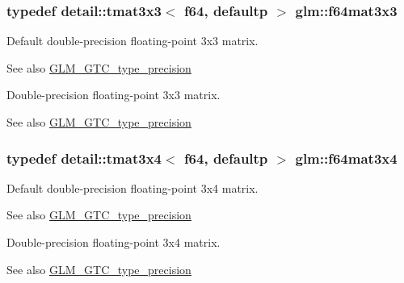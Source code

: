 \subsubsection[{\texorpdfstring{f64mat3x3}{f64mat3x3}}]{\setlength{\rightskip}{0pt plus 5cm}typedef detail\+::tmat3x3$<$ f64, defaultp $>$ {\bf glm\+::f64mat3x3}}\hypertarget{group__gtc__type__precision_gad74db0197015b8d1d77ce54cf8d0ae60}{}\label{group__gtc__type__precision_gad74db0197015b8d1d77ce54cf8d0ae60}
Default double-\/precision floating-\/point 3x3 matrix. \begin{DoxySeeAlso}{See also}
\hyperlink{group__gtc__type__precision}{G\+L\+M\+\_\+\+G\+T\+C\+\_\+type\+\_\+precision}
\end{DoxySeeAlso}
Double-\/precision floating-\/point 3x3 matrix. \begin{DoxySeeAlso}{See also}
\hyperlink{group__gtc__type__precision}{G\+L\+M\+\_\+\+G\+T\+C\+\_\+type\+\_\+precision} 
\end{DoxySeeAlso}
\subsubsection[{\texorpdfstring{f64mat3x4}{f64mat3x4}}]{\setlength{\rightskip}{0pt plus 5cm}typedef detail\+::tmat3x4$<$ f64, defaultp $>$ {\bf glm\+::f64mat3x4}}\hypertarget{group__gtc__type__precision_gac9468e5fa519d06b452d3126bb22a597}{}\label{group__gtc__type__precision_gac9468e5fa519d06b452d3126bb22a597}
Default double-\/precision floating-\/point 3x4 matrix. \begin{DoxySeeAlso}{See also}
\hyperlink{group__gtc__type__precision}{G\+L\+M\+\_\+\+G\+T\+C\+\_\+type\+\_\+precision}
\end{DoxySeeAlso}
Double-\/precision floating-\/point 3x4 matrix. \begin{DoxySeeAlso}{See also}
\hyperlink{group__gtc__type__precision}{G\+L\+M\+\_\+\+G\+T\+C\+\_\+type\+\_\+precision} 
\end{DoxySeeAlso}
